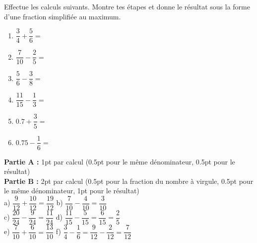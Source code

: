 
\question[8]
Effectue les calculs suivants. Montre tes étapes et donne le résultat sous la forme d'une fraction simplifiée au maximum.

\vspace{10pt}
\begin{enumerate}[leftmargin=*,align=parleft, label=\alph*), itemsep=60pt]
\item $\dfrac{3}{4} + \dfrac{5}{6} =$ 
\item $\dfrac{7}{10} - \dfrac{2}{5} =$ 
\item $\dfrac{5}{6} - \dfrac{3}{8} =$ 
\item $\dfrac{11}{15} - \dfrac{1}{3} =$ 
\item $0.7 + \dfrac{3}{5} =$ 
\item $0.75 - \dfrac{1}{6} =$ 
\end{enumerate}

\begin{solution}[0pt]
\textbf{Partie A :} 1pt par calcul (0.5pt pour le même dénominateur, 0.5pt pour le résultat)\\[4pt]
\textbf{Partie B :} 2pt par calcul (0.5pt pour la fraction du nombre à virgule, 0.5pt pour le même dénominateur, 1pt pour le résultat)\\[8pt]
a) $\dfrac{9}{12} + \dfrac{10}{12} = \dfrac{19}{12}$ \quad b) $\dfrac{7}{10} - \dfrac{4}{10} = \dfrac{3}{10}$\\[6pt]
c) $\dfrac{20}{24} - \dfrac{9}{24} = \dfrac{11}{24}$ \quad d) $\dfrac{11}{15} - \dfrac{5}{15} = \dfrac{6}{15} = \dfrac{2}{5}$\\[6pt]
e) $\dfrac{7}{10} + \dfrac{6}{10} = \dfrac{13}{10}$ \quad f) $\dfrac{3}{4} - \dfrac{1}{6} = \dfrac{9}{12} - \dfrac{2}{12} = \dfrac{7}{12}$
\end{solution}